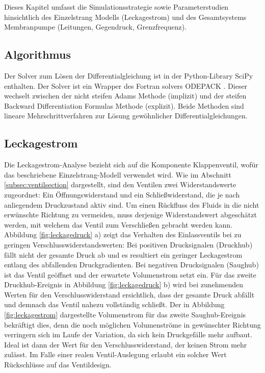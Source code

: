 \documentclass[fontsize=12pt, a4paper]{scrartcl}
\begin{document}
Dieses Kapitel umfasst die Simulationsstrategie sowie Parameterstudien hinsichtlich des Einzelstrang Modells (Leckagestrom) und des Gesamtsystems Membranpumpe (Leitungen, Gegendruck, Grenzfrequenz).

\subsection{Algorithmus}

Der Solver zum Lösen der Differentialgleichung ist in der Python-Library SciPy enthalten. Der Solver ist ein Wrapper des Fortran solvers ODEPACK \cite{odepack}. Dieser wechselt zwischen der nicht steifen Adams Methode (implizit) und der steifen Backward Differentiation Formulas Methode (explizit). Beide Methoden sind lineare Mehrschrittverfahren zur Lösung gewöhnlicher Differentialgleichungen.

\subsection{Leckagestrom}

Die Leckagestrom-Analyse bezieht sich auf die Komponente Klappenventil, wofür das beschriebene Einzelstrang-Modell verwendet wird. Wie im Abschnitt \ref{subsec:ventilsection} dargestellt, sind den Ventilen zwei Widerstandswerte zugeordnet: Ein Öffnungswiderstand und ein Schließwiderstand, die je nach anliegendem Druckzustand aktiv sind. Um einen Rückfluss des Fluids in die nicht erwünschte Richtung zu vermeiden, muss derjenige Widerstandswert abgeschätzt werden, mit welchem das Ventil zum Verschließen gebracht werden kann. Abbildung \ref{fig:leckagedruck} a) zeigt das Verhalten des Einlassventils bei zu geringen Verschlusswiderstandswerten: Bei positiven Drucksignalen (Druckhub) fällt nicht der gesamte Druck ab und es resultiert ein geringer Leckagestrom entlang des abfallenden Druckgradienten. Bei negativen Drucksignalen (Saughub) ist das Ventil geöffnet und der erwartete Volumenstrom setzt ein. Für das zweite Druckhub-Ereignis in Abbildung \ref{fig:leckagedruck} b) wird bei zunehmenden Werten für den Verschlusswiderstand ersichtlich, dass der gesamte Druck abfällt und demnach das Ventil nahezu vollständig schließt. Der in  Abbildung \ref{fig:leckagestrom} dargestellte Volumenstrom für das zweite Saughub-Ereignis bekräftigt dies, denn die noch möglichen Volumenströme in gewünschter Richtung verringern sich im Laufe der Variation, da sich kein Druckgefälle mehr aufbaut. Ideal ist dann der Wert für den Verschlusswiderstand, der keinen Strom mehr zulässt. Im Falle einer realen Ventil-Auslegung erlaubt ein solcher Wert Rückschlüsse auf das Ventildesign.
\end{document}
